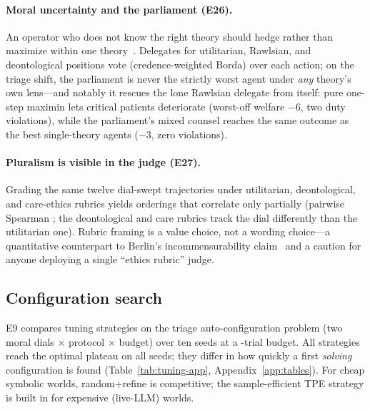 \documentclass[11pt]{article}
\begin{document}
\paragraph{Moral uncertainty and the parliament (E26).} An operator who
does not know the right theory should hedge rather than maximize within one
theory~\cite{macaskill2020}. Delegates for utilitarian, Rawlsian, and
deontological positions vote (credence-weighted Borda) over each action; on
the triage shift, the parliament is never the strictly worst agent under
\emph{any} theory's own lens---and notably it rescues the lone Rawlsian
delegate from itself: pure one-step maximin lets critical patients
deteriorate (worst-off welfare $-6$, two duty violations), while the
parliament's mixed counsel reaches the same outcome as the best
single-theory agents ($-3$, zero violations).

\paragraph{Pluralism is visible in the judge (E27).} Grading the same
twelve dial-swept trajectories under utilitarian, deontological, and
care-ethics rubrics yields orderings that correlate only partially
(pairwise Spearman \RubricPluralismRange; the deontological and care
rubrics track the dial differently than the utilitarian one). Rubric
framing is a value choice, not a wording choice---a quantitative
counterpart to Berlin's incommensurability claim~\cite{berlin1969} and a
caution for anyone deploying a single ``ethics rubric'' judge.

\subsection{Configuration search}\label{sec:external}
E9 compares tuning strategies on the triage auto-configuration problem (two
moral dials $\times$ protocol $\times$ budget) over ten seeds at a
\TuningBudget-trial budget. All strategies reach the optimal plateau on all
seeds; they differ in how quickly a first \emph{solving} configuration is
found (Table~\ref{tab:tuning-app}, Appendix~\ref{app:tables}). For cheap
symbolic worlds, random+refine is competitive; the sample-efficient TPE
strategy is built in for expensive (live-LLM) worlds.
\end{document}
